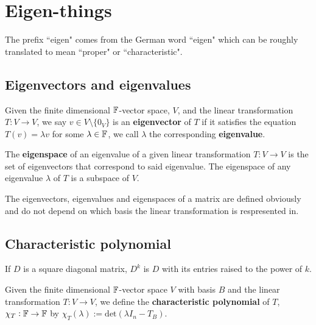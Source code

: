 \section{Eigen-things}
The prefix ``eigen" comes from the German word ``eigen" which can be roughly translated to mean ``proper" or ``characteristic".

\subsection{Eigenvectors and eigenvalues}

\begin{definition}
    Given the finite dimensional $\mathbb{F}$-vector space, $V$, and the linear transformation $T:V\rightarrow V$, we say $v\in V\setminus{\{0_V\}}$ is an \textbf{eigenvector} of $T$ if it satisfies the equation $T(v)=\lambda v$ for some $\lambda \in \mathbb{F}$, we call $\lambda$ the corresponding \textbf{eigenvalue}.
\end{definition}

\begin{definition}[Eigenspace]
    The \textbf{eigenspace} of an eigenvalue of a given linear transformation $T:V\rightarrow V$ is the set of eigenvectors that correspond to said eigenvalue. The eigenspace of any eigenvalue $\lambda$  of $T$ is a subspace of $V$.
\end{definition}

\begin{remark}
    The eigenvectors, eigenvalues and eigenspaces of a matrix are defined obviously and do not depend on which basis the linear transformation is respresented in.
\end{remark}

\subsection{Characteristic polynomial}

\begin{theorem}
    If $D$ is a square diagonal matrix, $D^k$ is $D$ with its entries raised to the power of $k$.
\end{theorem}

\begin{definition}
    Given the finite dimensional $\mathbb{F}$-vector space $V$ with basis $B$ and the linear transformation $T:V\rightarrow V$, we define the \textbf{characteristic polynomial} of $T$, $\chi_T:\mathbb{F}\rightarrow\mathbb{F}$ by $\chi_T(\lambda):= \text{det}(\lambda I_n-T_B)$.
\end{definition}

